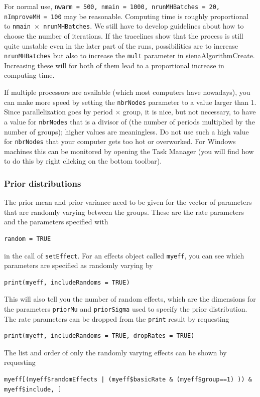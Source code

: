 \documentclass[a4paper,fleqn,11pt]{article}
\newcommand{\+}{\, + \,}
\begin{document}
For normal use, \texttt{nwarm = 500, nmain = 1000, nrunMHBatches = 20, nImproveMH = 100}
may be reasonable.
Computing time is roughly proportional to
\texttt{nmain $\times$ nrunMHBatches}.
We still have to develop guidelines about how to choose the number of
iterations. If the tracelines show that the process is still quite
unstable even in the later part of the runs, possibilities are to
increase \texttt{nrunMHBatches} but also to increase the \texttt{mult} parameter in
\textsf{sienaAlgorithmCreate}. Increasing these will for both of them lead to
a proportional increase in computing time.

If multiple processors are available (which most computers have nowadays),
you can make more speed by setting the \texttt{nbrNodes} parameter to a value
larger than 1. Since parallelization goes by period $\times$ group,
it is nice, but not necessary, to have a value for \texttt{nbrNodes} that
is a divisor of (the number of periods multiplied by the number of groups);
higher values are meaningless.
Do not use such a high value for \texttt{nbrNodes} that your computer gets too
 hot or overworked. For Windows machines this can be monitored by opening
 the Task Manager (you will find how to do this by right clicking on the bottom
 toolbar).

\subsubsection{Prior distributions}

The prior mean and prior variance need to be given for the vector of parameters
that are randomly varying between the groups.
These are the rate parameters and the parameters specified with
\begin{verbatim}
random = TRUE
\end{verbatim}
in the call of \texttt{setEffect}.
For an effects object called \texttt{myeff}, you can see which
parameters are specified as randomly varying by
\begin{verbatim}
print(myeff, includeRandoms = TRUE)
\end{verbatim}
This will also tell you the number of random effects, which are the
dimensions for the parameters \texttt{priorMu} and  \texttt{priorSigma}
used to specify the prior distribution.
The rate parameters can be dropped from the \texttt{print} result
by requesting
\begin{verbatim}
print(myeff, includeRandoms = TRUE, dropRates = TRUE)
\end{verbatim}
The list and order of only the randomly varying effects
can be shown by requesting
{\small
\begin{verbatim}
myeff[(myeff$randomEffects | (myeff$basicRate & (myeff$group==1) )) & myeff$include, ]
\end{verbatim}
}
\end{document}
